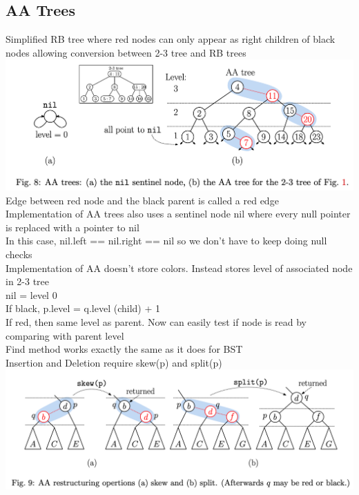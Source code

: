 \documentclass{article}
\begin{document}
  \subsection{AA Trees}
  Simplified RB tree where red nodes can only appear as right children of black nodes allowing conversion between 2-3 tree and RB trees \\
  \includegraphics[width=\textwidth]{AATree}
  \indent Edge between red node and the black parent is called a red edge \\
  \indent Implementation of AA trees also uses a sentinel node nil where every null pointer is replaced with a pointer to nil\\
  \indent \indent In this case, nil.left == nil.right == nil so we don't have to keep doing null checks \\
  \indent Implementation of AA doesn't store colors. Instead stores level of associated node in 2-3 tree \\
  \indent \indent nil = level 0\\
  \indent \indent If black, p.level = q.level (child) + 1\\
  \indent \indent If red, then same level as parent. Now can easily test if node is read by comparing with parent level \\
  Find method works exactly the same as it does for BST \\
  Insertion and Deletion require skew(p) and split(p)\\
  \includegraphics[width=\textwidth]{AASkewSplit}
\end{document}
